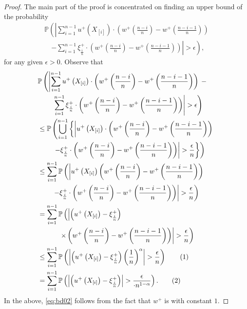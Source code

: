 \begin{proof}
The main part of the proof is concentrated on finding an upper bound of the probability
\begin{align*}
\mathbb{P} \left( \left| \sum_{i=1}^{n-1} u^+\left(X_{[i]}\right) \cdot \left(w^+\left(\frac{n-i}{n} \right)  - w^+\left(\frac{n-i-1}{n} \right) \right) \right.\right.\\
\quad\left.\left. -
\sum_{i=1}^{n-1} \xi^+_{\frac{i}{n}} \cdot \left(w^+\left(\frac{n-i}{n} \right)  - w^+\left(\frac{n-i-1}{n} \right) \right) \right| >
\epsilon\right),
\end{align*}
for any given $\epsilon>0$.
Observe that
\begin{align*}
& \mathbb{P} \left( \left| \sum_{i=1}^{n-1} u^+\left(X_{[i]}\right) \cdot \left(w^+\left(\frac{n-i}{n} \right)  - w^+\left(\frac{n-i-1}{n} \right) \right) \right.\right. -\\
&\qquad\left.\left.\sum_{i=1}^{n-1} \xi^+_{\frac{i}{n}} \cdot \left(w^+\left(\frac{n-i}{n} \right)  - w^+\left(\frac{n-i-1}{n} \right) \right) \right| >
\epsilon\right) \\ 
& \leq \mathbb{P}\left( \bigcup _{i=1}^{n-1} \left\{ \left| u^+\left(X_{[i]}\right) \cdot \left(w^+\left(\frac{n-i}{n}\right) -
w^+\left(\frac{n-i-1}{n}\right)\right)\right.\right.\right. \\
&\qquad\left.\left.\left.- \xi^+_{\frac{i}{n}} \cdot \left(w^+\left(\frac{n-i}{n} \right)  - w^+\left(\frac{n-i-1}{n} \right) \right)
\right| > \frac{\epsilon}{n} \right\}\right) \\ 
& \leq \sum _{i=1}^{n-1} \mathbb{P}\left( \left| u^+\left(X_{[i]}\right) 
\left(w^+\left(\frac{n-i}{n} \right)  - w^+\left(\frac{n-i-1}{n} \right) \right)\right.\right. \\
&\qquad\left.\left.- \xi^+_{\frac{i}{n}} \cdot \left(w^+\left(\frac{n-i}{n}\right) -
w^+\left(\frac{n-i-1}{n}\right)\right) \right| > \frac{\epsilon}{n}\right) \\ 
& = \sum _{i=1}^{n-1} \mathbb{P}\left( \left| \left( u^+\left(X_{[i]}\right) -
\xi^+_{\frac{i}{n}}\right)\right.\right. \\
&\quad\qquad\left.\left.\times\left(w^+\left(\frac{n-i}{n} \right)  - w^+\left(\frac{n-i-1}{n} \right) \right) \right| > \frac{\epsilon}{n}\right)
\\ 
& \leq \sum _{i=1}^{n-1} \Prob{ \left| \left( u^+\left(X_{[i]}\right) - \xi^+_{\frac{i}{n}}\right) \left(\frac{1}{n}\right)^{\alpha}
\right| > \frac{\epsilon}{n}} \stepcounter{equation}\tag{\theequation}\label{eq:bd02}\\ 
& = \sum _{i=1}^{n-1} \Prob{ \left| \left( u^+\left(X_{[i]}\right) - \xi^+_{\frac{i}{n}}\right)
\right| > \frac{\epsilon}{\cdot n^{1-\alpha}}}.\stepcounter{equation}\tag{\theequation}\label{eq:bd12}
\end{align*}
In the above, \eqref{eq:bd02} follows from the fact that $w^+$ is \holder with constant $1$.


\end{proof}
